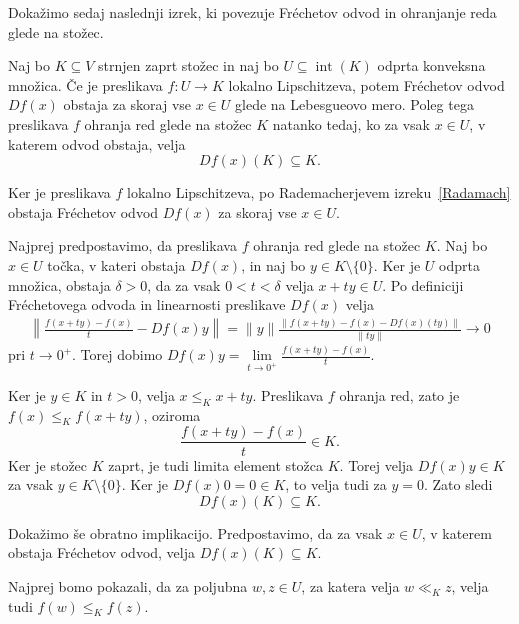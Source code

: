 \documentclass[mat2, tisk]{fmfdelo}
\begin{document}
Dokažimo sedaj naslednji izrek, ki povezuje Fréchetov odvod in ohranjanje reda glede na stožec.
\begin{izrek}\label{izrLipFreLeb}
Naj bo $K \subseteq V$ strnjen zaprt stožec in naj bo $U \subseteq \operatorname{int}(K)$ odprta konveksna množica.
Če je preslikava
$f : U \to K$
lokalno Lipschitzeva, potem Fréchetov odvod $Df(x)$ obstaja za skoraj vse
$x \in U$
glede na Lebesgueovo mero.
Poleg tega preslikava $f$ ohranja red glede na stožec $K$
natanko tedaj, ko za vsak $x \in U$, v katerem odvod obstaja, velja
\[
Df(x)(K)\subseteq K.
\]
\end{izrek}
\begin{dokaz}
Ker je preslikava $f$ lokalno Lipschitzeva, po
Rademacherjevem izreku~\ref{Radamach} obstaja Fréchetov odvod
$Df(x)$ za skoraj vse $x \in U$.

Najprej predpostavimo, da preslikava $f$ ohranja red
glede na stožec $K$. Naj bo $x \in U$ točka,
v kateri obstaja $Df(x)$, in naj bo $y \in K\setminus\{0\}$.
Ker je $U$ odprta množica, obstaja $\delta>0$,
da za vsak $0<t<\delta$ velja $x+ty\in U$.
Po definiciji Fréchetovega odvoda in linearnosti
preslikave $Df(x)$ velja
\[
\begin{aligned}
\left\|
\frac{f(x+ty)-f(x)}{t}-Df(x)y
\right\|
=
\|y\|
\frac{\|f(x+ty)-f(x)-Df(x)(ty)\|}{\|ty\|}
\longrightarrow 0
\end{aligned}
\]
pri $t\to 0^+$.
Torej dobimo
$Df(x)y
=
\lim\limits_{t\to 0^+}
\frac{f(x+ty)-f(x)}{t}$.

Ker je $y\in K$ in $t>0$, velja
$x\leq_K x+ty$. Preslikava $f$ ohranja red,
zato je
$f(x)\leq_K f(x+ty)$,
oziroma
\[
\frac{f(x+ty)-f(x)}{t}\in K.
\]
Ker je stožec $K$ zaprt, je tudi limita
element stožca $K$.
Torej velja $Df(x)y\in K$ za vsak
$y\in K\setminus\{0\}$.
Ker je $Df(x)0=0\in K$, to velja tudi
za $y=0$. Zato sledi
\[
Df(x)(K)\subseteq K.
\]

Dokažimo še obratno implikacijo.
Predpostavimo, da za vsak $x\in U$, v katerem
obstaja Fréchetov odvod, velja
$Df(x)(K)\subseteq K$.

Najprej bomo pokazali, da za poljubna
$w,z\in U$, za katera velja $w\ll_K z$,
velja tudi $f(w)\leq_K f(z)$.


\end{dokaz}
\end{document}
